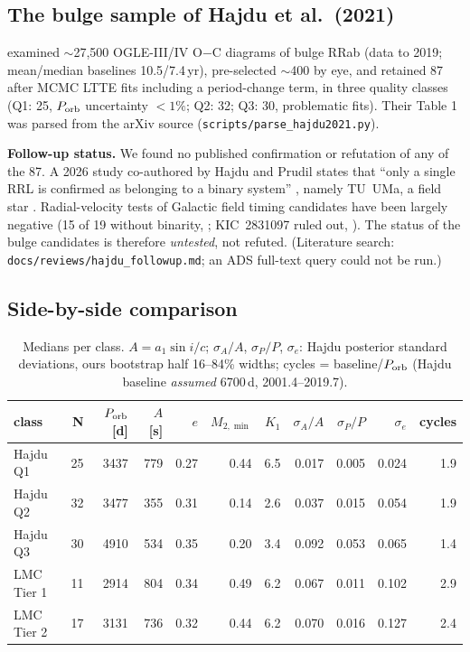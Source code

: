 \documentclass[11pt]{article}
\begin{document}
\subsection{The bulge sample of Hajdu et al.\ (2021)}
\citet{Hajdu2021} examined $\sim$27{,}500 OGLE-III/IV O$-$C diagrams of bulge RRab (data to 2019; mean/median baselines 10.5/7.4\,yr),
pre-selected $\sim$400 by eye, and retained 87 after MCMC LTTE fits including a period-change term, in three quality classes
(Q1: 25, $P_{\rm orb}$ uncertainty $<1\%$; Q2: 32; Q3: 30, problematic fits). Their Table 1 was parsed from the arXiv source
(\texttt{scripts/parse\_hajdu2021.py}).

\textbf{Follow-up status.} We found no published confirmation or refutation of any of the 87. A 2026 study co-authored by Hajdu
and Prudil states that ``only a single RRL is confirmed as belonging to a binary system'' \citep{Salinas2026}, namely
TU~UMa, a field star \citep{Liska2016}. Radial-velocity tests of Galactic field timing candidates have been largely negative
(15 of 19 without binarity, \citealt{Barnes2021}; KIC~2831097 ruled out, \citealt{Poretti2025}). The status of the bulge
candidates is therefore \emph{untested}, not refuted. (Literature search: \texttt{docs/reviews/hajdu\_followup.md}; an ADS
full-text query could not be run.)

\subsection{Side-by-side comparison}
\begin{table}[h]
\centering
\caption{Medians per class. $A=a_1\sin i/c$; $\sigma_A/A$, $\sigma_P/P$, $\sigma_e$: Hajdu posterior standard deviations, ours
bootstrap half 16--84\% widths; cycles = baseline/$P_{\rm orb}$ (Hajdu baseline \emph{assumed} 6700\,d, 2001.4--2019.7).}
\label{tab:hajdu}
\small
\begin{tabular}{lrrrrrrrrrr}
\toprule
class & N & $P_{\rm orb}$ [d] & $A$ [s] & $e$ & $M_{2,\min}$ & $K_1$ & $\sigma_A/A$ & $\sigma_P/P$ & $\sigma_e$ & cycles\\
\midrule
Hajdu Q1 & 25 & 3437 & 779 & 0.27 & 0.44 & 6.5 & 0.017 & 0.005 & 0.024 & 1.9\\
Hajdu Q2 & 32 & 3477 & 355 & 0.31 & 0.14 & 2.6 & 0.037 & 0.015 & 0.054 & 1.9\\
Hajdu Q3 & 30 & 4910 & 534 & 0.35 & 0.20 & 3.4 & 0.092 & 0.053 & 0.065 & 1.4\\
LMC Tier 1 & 11 & 2914 & 804 & 0.34 & 0.49 & 6.2 & 0.067 & 0.011 & 0.102 & 2.9\\
LMC Tier 2 & 17 & 3131 & 736 & 0.32 & 0.44 & 6.2 & 0.070 & 0.016 & 0.127 & 2.4\\
\bottomrule
\end{tabular}
\end{table}
\end{document}
